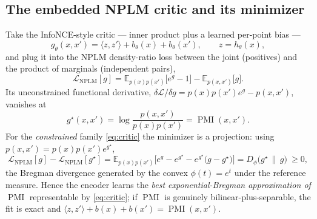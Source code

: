 \documentclass[11pt]{article}
\begin{document}
\subsection{The embedded NPLM critic and its minimizer}
Take the InfoNCE-style critic --- inner product plus a learned per-point bias ---
\begin{equation}
g_\theta(x,x') = \langle z, z'\rangle + b_\theta(x) + b_\theta(x'),
\qquad z=h_\theta(x),
\label{eq:critic}
\end{equation}
and plug it into the NPLM density-ratio loss between the joint (positives) and the
product of marginals (independent pairs),
\begin{equation}
\mathcal{L}_{\mathrm{NPLM}}[g]
= \mathbb{E}_{p(x)p(x')}\!\big[e^{g}-1\big]
- \mathbb{E}_{p(x,x')}\big[g\big].
\label{eq:Lnplm}
\end{equation}
Its unconstrained functional derivative,
$\delta\mathcal{L}/\delta g = p(x)p(x')e^{g}-p(x,x')$, vanishes at
\begin{equation}
g^\star(x,x') = \log\frac{p(x,x')}{p(x)p(x')} = \operatorname{PMI}(x,x').
\end{equation}
For the \emph{constrained} family \eqref{eq:critic} the minimizer is a projection:
using $p(x,x')=p(x)p(x')e^{g^\star}$,
\begin{equation}
\mathcal{L}_{\mathrm{NPLM}}[g]-\mathcal{L}_{\mathrm{NPLM}}[g^\star]
= \mathbb{E}_{p(x)p(x')}\!\Big[e^{g}-e^{g^\star}-e^{g^\star}\big(g-g^\star\big)\Big]
= D_\phi\!\big(g^\star\,\|\,g\big)\ \ge 0,
\label{eq:bregman}
\end{equation}
the Bregman divergence generated by the convex $\phi(t)=e^{t}$ under the reference
measure. Hence the encoder learns the \emph{best exponential-Bregman approximation
of $\operatorname{PMI}$} representable by \eqref{eq:critic}; if $\operatorname{PMI}$
is genuinely bilinear-plus-separable, the fit is exact and
$\langle z,z'\rangle+b(x)+b(x') = \operatorname{PMI}(x,x')$.
\end{document}

